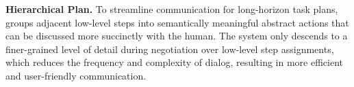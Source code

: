 


\textbf{Hierarchical Plan.} To streamline communication for long-horizon task plans, \methodname{} groups adjacent low-level steps into semantically meaningful abstract actions that can be discussed more succinctly with the human.
The system only descends to a finer-grained level of detail during negotiation over low-level step assignments, which reduces the frequency and complexity of dialog, resulting in more efficient and user-friendly communication.


